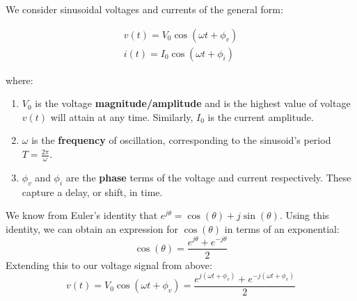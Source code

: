


We consider sinusoidal voltages and currents of the general form:

\vspace{-15px}
\begin{align*}
v(t) = V_0 \cos(\omega t + \phi_v) \\
i(t) = I_0 \cos(\omega t + \phi_i)
\end{align*}
\vspace{-15px}

\renewcommand{\arraystretch}{1.5}

where:

\begin{enumerate}
\item
    $V_0$ is the voltage \textbf{magnitude/amplitude} and is the highest value of voltage $v(t)$ will attain at any time. Similarly, $I_0$ is the current
    amplitude.
\item
    $\omega$ is the \textbf{frequency} of oscillation, corresponding to the sinusoid's period $T = \frac{2\pi}{\omega}$.
\item
    $\phi_v$ and $\phi_i$ are the \textbf{phase} terms of the voltage and current respectively. These capture a delay, or shift, in time.
\end{enumerate}

We know from Euler's identity that $e^{j\theta}=\cos(\theta)+j\sin(\theta)$. Using this identity, we can obtain an expression for $\cos(\theta)$ in terms of an exponential:
\[\cos(\theta)=\frac{e^{j\theta} + e^{-j\theta}}{2}\]
Extending this to our voltage signal from above:
\[v(t) = V_0 \cos(\omega t + \phi_v)=\frac{e^{j(\omega t +\phi_v)} + e^{-j(\omega t +\phi_v)}}{2}\]
\vspace{-10px}

